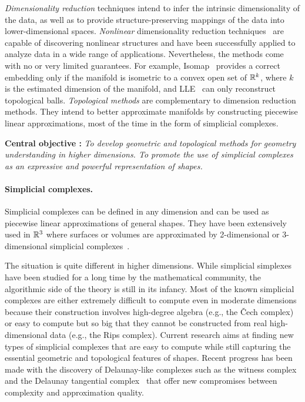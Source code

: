 {\em Dimensionality reduction} techniques intend to infer the intrinsic dimensionality of the data, as well as to provide structure-preserving mappings of the data into lower-dimensional spaces. {\em Nonlinear} dimensionality reduction techniques~\cite{lv-nldr-2007} are capable of discovering {nonlinear} structures and have been successfully applied to analyze data in a wide range of applications.
Nevertheless, the methods come with no or very limited guarantees. For example, Isomap~\cite{tsl-isomap-2000} provides a correct embedding only if the manifold is isometric to a convex open set of $\mathbb R ^k$, where $k$ is the estimated dimension of the manifold, and LLE~\cite{rs-lle-2000} can only reconstruct topological balls. {\em Topological methods} are complementary to dimension reduction methods. They intend to better approximate manifolds by constructing piecewise linear approximations, most of the time  in the form of simplicial complexes.

\vspace{2mm}  

{\bf Central objective :} {\em To develop geometric and topological methods for geometry understanding in higher dimensions.  To promote the use  of simplicial complexes as an expressive and powerful representation of shapes. }

\paragraph{Simplicial complexes.}  Simplicial complexes can be defined in any dimension and can be used as piecewise linear approximations of general shapes.
They have been extensively used in $\mathbb R ^3$ where surfaces or volumes are approximated by 2-dimensional or 3-dimensional simplicial complexes~\cite{geometrica-ecg-book}. 

The situation is quite different in higher dimensions. While simplicial simplexes have been studied for a long time by the mathematical community, the algorithmic side of the theory is still in its infancy. Most of the known simplicial complexes are either extremely difficult to compute even in moderate dimensions because their construction involves high-degree algebra (e.g., the  \v{C}ech complex) or easy to compute but so big that they cannot be constructed from real high-dimensional data (e.g., the Rips complex). Current research aims at finding new types of simplicial complexes that are easy to compute while still capturing the essential geometric and topological features of shapes. Recent progress has been made with the discovery of Delaunay-like complexes such as the witness complex~\cite{cds-tewc-2004} and the Delaunay tangential complex~\cite{geometrica-7142i} that offer new compromises between complexity and approximation quality.

